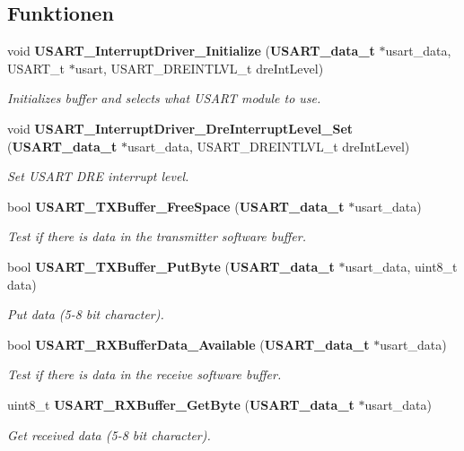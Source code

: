 \subsection*{Funktionen}
\begin{DoxyCompactItemize}
\item 
void {\bf USART\_\-InterruptDriver\_\-Initialize} ({\bf USART\_\-data\_\-t} $\ast$usart\_\-data, USART\_\-t $\ast$usart, USART\_\-DREINTLVL\_\-t dreIntLevel)
\begin{DoxyCompactList}\small\item\em Initializes buffer and selects what USART module to use. \item\end{DoxyCompactList}\item 
void {\bf USART\_\-InterruptDriver\_\-DreInterruptLevel\_\-Set} ({\bf USART\_\-data\_\-t} $\ast$usart\_\-data, USART\_\-DREINTLVL\_\-t dreIntLevel)
\begin{DoxyCompactList}\small\item\em Set USART DRE interrupt level. \item\end{DoxyCompactList}\item 
bool {\bf USART\_\-TXBuffer\_\-FreeSpace} ({\bf USART\_\-data\_\-t} $\ast$usart\_\-data)
\begin{DoxyCompactList}\small\item\em Test if there is data in the transmitter software buffer. \item\end{DoxyCompactList}\item 
bool {\bf USART\_\-TXBuffer\_\-PutByte} ({\bf USART\_\-data\_\-t} $\ast$usart\_\-data, uint8\_\-t data)
\begin{DoxyCompactList}\small\item\em Put data (5-\/8 bit character). \item\end{DoxyCompactList}\item 
bool {\bf USART\_\-RXBufferData\_\-Available} ({\bf USART\_\-data\_\-t} $\ast$usart\_\-data)
\begin{DoxyCompactList}\small\item\em Test if there is data in the receive software buffer. \item\end{DoxyCompactList}\item 
uint8\_\-t {\bf USART\_\-RXBuffer\_\-GetByte} ({\bf USART\_\-data\_\-t} $\ast$usart\_\-data)
\begin{DoxyCompactList}\small\item\em Get received data (5-\/8 bit character). \item\end{DoxyCompactList}\item 

\end{DoxyCompactItemize}
